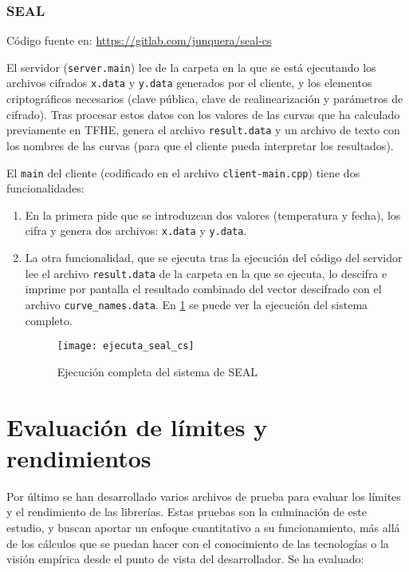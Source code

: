 \subsubsection{SEAL}

Código fuente en: \url{https://gitlab.com/junquera/seal-cs}

El servidor (\verb|server.main|) lee de la carpeta en la que se está ejecutando los archivos cifrados \verb|x.data| y \verb|y.data| generados por el cliente, y los elementos criptográficos necesarios (clave pública, clave de realinearización y parámetros de cifrado). Tras procesar estos datos con los valores de las curvas que ha calculado previamente en TFHE, genera el archivo \verb|result.data| y un archivo de texto con los nombres de las curvas (para que el cliente pueda interpretar los resultados).

El \verb|main| del cliente (codificado en el archivo \verb|client-main.cpp|) tiene dos funcionalidades:
\begin{enumerate}
    \item En la primera pide que se introduzcan dos valores (temperatura y fecha), los cifra y genera dos archivos: \verb|x.data| y \verb|y.data|.

    \item La otra funcionalidad, que se ejecuta tras la ejecución del código del servidor lee el archivo  \verb|result.data| de la carpeta en la que se ejecuta, lo descifra e imprime por pantalla el resultado combinado del vector descifrado con el archivo \verb|curve_names.data|. En \ref{fig:ejecuta_seal_cs} se puede ver la ejecución del sistema completo.

  \begin{figure}[h]
    \centering
    \texttt{[image: ejecuta\_seal\_cs]}
    \caption{Ejecución completa del sistema de SEAL} \label{fig:ejecuta_seal_cs}
  \end{figure}
\end{enumerate}

\section{Evaluación de límites y rendimientos}

Por último se han desarrollado varios archivos de prueba para evaluar los límites y el rendimiento de las librerías. Estas pruebas son la culminación de este estudio, y buscan aportar un enfoque cuantitativo a su funcionamiento, más allá de los cálculos que se puedan hacer con el conocimiento de las tecnologías o la visión empírica desde el punto de vista del desarrollador. Se ha evaluado:


